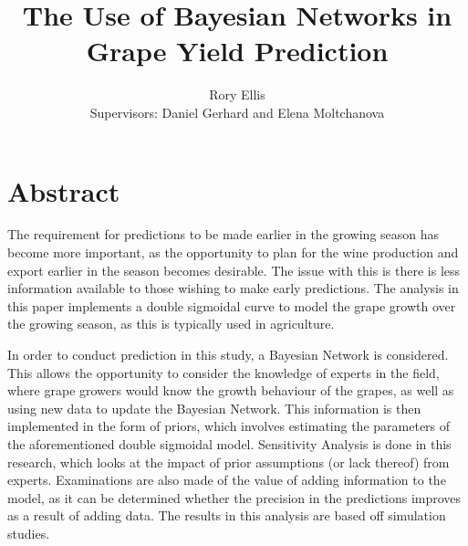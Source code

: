 \documentclass{article}
\title{The Use of Bayesian Networks in Grape Yield Prediction}
\author{Rory Ellis\\[1cm]{\small Supervisors: Daniel Gerhard and Elena Moltchanova}}
\begin{document}
\maketitle

\section{Abstract}
The requirement for predictions to be made earlier in the growing season has become more important, as the opportunity to plan for the wine production and export earlier in the season becomes desirable. The issue with this is there is less information available to those wishing to make early predictions. The analysis in this paper implements a double sigmoidal curve to model the grape growth over the growing season, as this is typically used in agriculture. 

In order to conduct prediction in this study, a Bayesian Network is considered. This allows the opportunity to consider the knowledge of experts in the field, where grape growers would know the growth behaviour of the grapes, as well as using new data to update the Bayesian Network. This information is then implemented in the form of priors, which involves estimating the parameters of the aforementioned double sigmoidal model. Sensitivity Analysis is done in this research, which looks at the impact of prior assumptions (or lack thereof) from experts. Examinations are also made of the value of adding information to the model, as it can be determined whether the precision in the predictions improves as a result of adding data. The results in this analysis are based off simulation studies.
\end{document}
